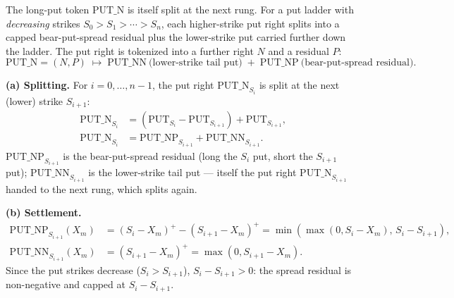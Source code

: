 \documentclass[11pt]{article}
\newcommand{\pos}[1]{\left(#1\right)^+}
\newcommand{\Put}{\mathrm{PUT}}
\newcommand{\PN}{\mathrm{PUT\_N}}
\newcommand{\PNP}{\mathrm{PUT\_NP}}
\newcommand{\PNN}{\mathrm{PUT\_NN}}
\newcommand{\PNat}[1]{\mathrm{PUT\_N}_{#1}}
\newcommand{\PNPi}[1]{\mathrm{PUT\_NP}_{#1}}
\newcommand{\PNNi}[1]{\mathrm{PUT\_NN}_{#1}}
\begin{document}
\begin{center}
\end{center}

The long-put token $\PN$ is itself split at the next rung. For a put ladder with
\emph{decreasing} strikes $S_0>S_1>\cdots>S_n$, each higher-strike put right splits into a
capped bear-put-spread residual plus the lower-strike put carried further down the ladder. The
put right is tokenized into a further right $N$ and a residual $P$:
\[
\PN = (N,P) \;\longmapsto\; \PNN\ \text{(lower-strike tail put)} \;+\; \PNP\ \text{(bear-put-spread residual)} .
\]

\textbf{(a) Splitting.} For $i=0,\dots,n-1$, the put right $\PNat{S_i}$ is split at the
next (lower) strike $S_{i+1}$:
\begin{align}
\PNat{S_i} &=(\Put_{S_i}-\Put_{S_{i+1}})+\Put_{S_{i+1}},\\
\PNat{S_i} &=\PNPi{S_{i+1}}+\PNNi{S_{i+1}}.
\end{align}
$\PNPi{S_{i+1}}$ is the bear-put-spread residual (long the $S_i$ put, short the $S_{i+1}$
put); $\PNNi{S_{i+1}}$ is the lower-strike tail put --- itself the put right $\PNat{S_{i+1}}$
handed to the next rung, which splits again.

\textbf{(b) Settlement.}
\begin{align}
\PNPi{S_{i+1}}(X_m) &=\pos{S_i-X_m}-\pos{S_{i+1}-X_m}
=\min\!\left(\max(0,S_i-X_m),\,S_i-S_{i+1}\right),\\
\PNNi{S_{i+1}}(X_m) &=\pos{S_{i+1}-X_m}=\max(0,S_{i+1}-X_m).
\end{align}
Since the put strikes decrease ($S_i>S_{i+1}$), $S_i-S_{i+1}>0$: the spread residual is
non-negative and capped at $S_i-S_{i+1}$.
\end{document}
